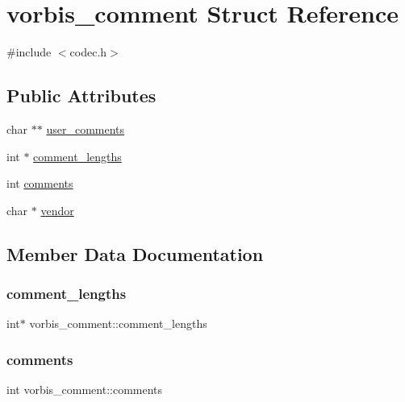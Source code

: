 \hypertarget{structvorbis__comment}{}\section{vorbis\+\_\+comment Struct Reference}
\label{structvorbis__comment}


{\ttfamily \#include $<$codec.\+h$>$}

\subsection*{Public Attributes}
\begin{DoxyCompactItemize}
\item 
char $\ast$$\ast$ \hyperlink{structvorbis__comment_ac45cb70542b0be5ce3e8d85db6df48ec}{user\+\_\+comments}
\item 
int $\ast$ \hyperlink{structvorbis__comment_a4698d400a859e9338a5828ead97cacdf}{comment\+\_\+lengths}
\item 
int \hyperlink{structvorbis__comment_aa338208fb0f485b3818832a7d07dbe92}{comments}
\item 
char $\ast$ \hyperlink{structvorbis__comment_a1f25158a2c045a6dd8a13b33b34612d3}{vendor}
\end{DoxyCompactItemize}


\subsection{Member Data Documentation}
\mbox{\label{structvorbis__comment_a4698d400a859e9338a5828ead97cacdf}} 
\subsubsection{\texorpdfstring{comment\+\_\+lengths}{comment\_lengths}}
{\footnotesize\ttfamily int$\ast$ vorbis\+\_\+comment\+::comment\+\_\+lengths}

\mbox{\label{structvorbis__comment_aa338208fb0f485b3818832a7d07dbe92}} 
\subsubsection{\texorpdfstring{comments}{comments}}
{\footnotesize\ttfamily int vorbis\+\_\+comment\+::comments}

